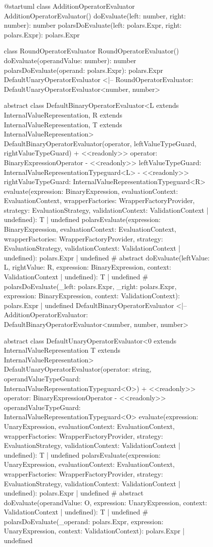 \begin{figure}
	\begin{plantuml}
		@startuml
		class AdditionOperatorEvaluator {
				AdditionOperatorEvaluator()
				doEvaluate(left: number, right: number): number
				polarsDoEvaluate(left: polars.Expr, right: polars.Expr): polars.Expr
			}

		class RoundOperatorEvaluator {
				RoundOperatorEvaluator()
				doEvaluate(operandValue: number): number
				polarsDoEvaluate(operand: polars.Expr): polars.Expr
			}
		DefaultUnaryOperatorEvaluator <|-- RoundOperatorEvaluator: DefaultUnaryOperatorEvaluator<number, number>

		abstract class DefaultBinaryOperatorEvaluator<L extends InternalValueRepresentation, R extends InternalValueRepresentation, T extends InternalValueRepresentation> {
		DefaultBinaryOperatorEvaluator(operator, leftValueTypeGuard, rightValueTypeGuard)
		+ <<readonly>> operator: BinaryExpressionOperator
		- <<readonly>> leftValueTypeGuard: InternalValueRepresentationTypeguard<L>
		- <<readonly>> rightValueTypeGuard: InternalValueRepresentationTypeguard<R>
		evaluate(expression: BinaryExpression, evaluationContext: EvaluationContext, wrapperFactories: WrapperFactoryProvider, strategy: EvaluationStrategy, validationContext: ValidationContext | undefined): T | undefined
		polarsEvaluate(expression: BinaryExpression, evaluationContext: EvaluationContext, wrapperFactories: WrapperFactoryProvider, strategy: EvaluationStrategy, validationContext: ValidationContext | undefined): polars.Expr | undefined
		# {abstract} doEvaluate(leftValue: L, rightValue: R, expression: BinaryExpression, context: ValidationContext | undefined): T | undefined
		# polarsDoEvaluate(_left: polars.Expr, _right: polars.Expr, expression: BinaryExpression, context: ValidationContext): polars.Expr | undefined
		}
		DefaultBinaryOperatorEvaluator <|-- AdditionOperatorEvaluator: DefaultBinaryOperatorEvaluator<number, number, number>

		abstract class DefaultUnaryOperatorEvaluator<0 extends InternalValueRepresentation T extends InternalValueRepresentation> {
		DefaultUnaryOperatorEvaluator(operator: string, operandValueTypeGuard: InternalValueRepresentationTypeguard<O>)
		+ <<readonly>> operator: BinaryExpressionOperator
		- <<readonly>> operandValueTypeGuard: InternalValueRepresentationTypeguard<O>
		evaluate(expression: UnaryExpression, evaluationContext: EvaluationContext, wrapperFactories: WrapperFactoryProvider, strategy: EvaluationStrategy, validationContext: ValidationContext | undefined): T | undefined
		polarsEvaluate(expression: UnaryExpression, evaluationContext: EvaluationContext, wrapperFactories: WrapperFactoryProvider, strategy: EvaluationStrategy, validationContext: ValidationContext | undefined): polars.Expr | undefined
		# {abstract} doEvaluate(operandValue: O, expression: UnaryExpression, context: ValidationContext | undefined): T | undefined
		# polarsDoEvaluate(_operand: polars.Expr, expression: UnaryExpression, context: ValidationContext): polars.Expr | undefined
		}


\end{plantuml}
\end{figure}
